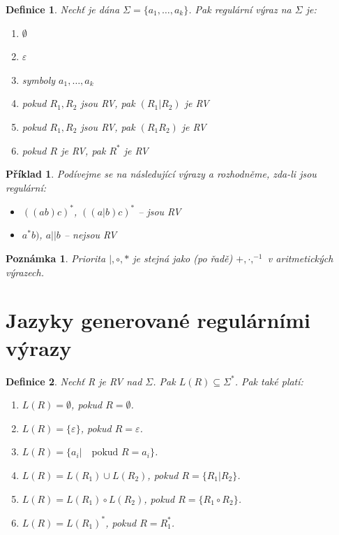 \documentclass[10pt, a4paper, titlepage]{article}
\theoremstyle{note}
\newtheorem{definice}{Definice}
\newtheorem{priklad}{Příklad}
\newtheorem{poznamka}{Poznámka}
\begin{document}
\begin{definice}
Nechť je dána $\Sigma = \lbrace a_{1}, \ldots, a_{k} \rbrace$. Pak regulární výraz na $\Sigma$ je:
\begin{enumerate}
\item
$\emptyset$

\item
$\varepsilon$

\item
symboly $a_{1}, \ldots, a_{k}$

\item
pokud $R_{1}, R_{2}$ jsou RV, pak $(R_{1}|R_{2})$ je RV

\item
pokud $R_{1}, R_{2}$ jsou RV, pak $(R_{1}R_{2})$ je RV

\item
pokud $R$ je RV, pak $R^{*}$ je RV
\end{enumerate}
\end{definice}

\begin{priklad}
Podívejme se na následující výrazy a rozhodněme, zda-li jsou regulární:

\begin{itemize}
\item
$((ab)c)^{*}$, $((a|b)c)^{*}$ -- jsou RV

\item
$a^{*}b)$, $a||b$ -- nejsou RV
\end{itemize}
\end{priklad}
\begin{poznamka}
Priorita $| , \circ , *$ je stejná jako (po řadě) $+ , \cdot , ^{-1}$ v aritmetických výrazech.
\end{poznamka}
\section{Jazyky generované regulárními výrazy}

\begin{definice}
Nechť \emph{R} je RV nad $\Sigma$. Pak $L(R) \subseteq \Sigma^{*}$. Pak také platí:

\begin{enumerate}
\item\label{jazyky-1}
$L(R) = \emptyset$, pokud $R = \emptyset$.

\item
$L(R) = \lbrace \varepsilon \rbrace$, pokud $R = \varepsilon$.

\item\label{jazyky-3}
$L(R) = \lbrace a_{i} | \quad \text{pokud } R=a_{i} \rbrace$.

\item\label{jazyky-4}
$L(R) = L(R_{1}) \cup L(R_{2})$, pokud $R=\lbrace R_{1} | R_{2} \rbrace$. 

\item\label{jazyky-5}
$L(R) = L(R_{1}) \circ L(R_{2})$, pokud $R=\lbrace R_{1}\circ R_{2} \rbrace$.

\item\label{jazyky-6}
$L(R) = L(R_{1})^{*} $, pokud $R = R_{1}^{*}$.
\end{enumerate}
\end{definice}
\end{document}
